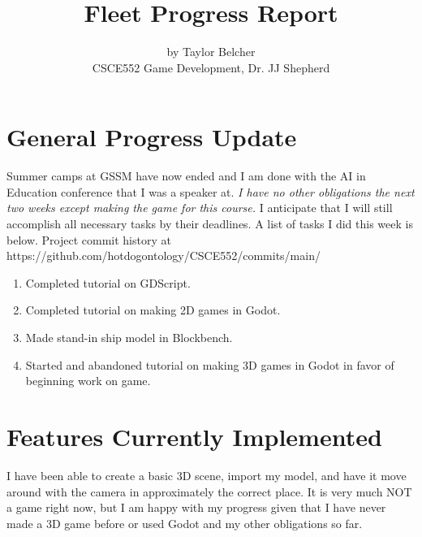 \documentclass[journal]{IEEEtran}
\begin{document}
%
\title{Fleet Progress Report}
\author{by Taylor Belcher \\ CSCE552 Game Development, Dr. JJ Shepherd}
\maketitle

\tableofcontents 

\section{General Progress Update}

Summer camps at GSSM have now ended and I am done with the AI in Education conference that I was a speaker at. \emph{I have no other obligations the next two weeks except making the game for this course.} I anticipate that I will still accomplish all necessary tasks by their deadlines. A list of tasks I did this week is below. Project commit history at https://github.com/hotdogontology/CSCE552/commits/main/
\begin{enumerate}
    \item Completed tutorial on GDScript.
    \item Completed tutorial on making 2D games in Godot.
    \item Made stand-in ship model in Blockbench.
    \item Started and abandoned tutorial on making 3D games in Godot in favor of beginning work on game.
\end{enumerate}



\section{Features Currently Implemented}

I have been able to create a basic 3D scene, import my model, and have it move around with the camera in approximately the correct place. It is very much NOT a game right now, but I am happy with my progress given that I have never made a 3D game before or used Godot and my other obligations so far.
\end{document}
